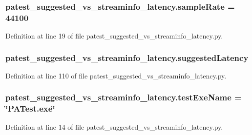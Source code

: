 \subsubsection[{\texorpdfstring{sample\+Rate}{sampleRate}}]{ patest\+\_\+suggested\+\_\+vs\+\_\+streaminfo\+\_\+latency.\+sample\+Rate = 44100}\hypertarget{namespacepatest__suggested__vs__streaminfo__latency_a14f2ecd6f756d329f6df4096833062d0}{}\label{namespacepatest__suggested__vs__streaminfo__latency_a14f2ecd6f756d329f6df4096833062d0}


Definition at line 19 of file patest\+\_\+suggested\+\_\+vs\+\_\+streaminfo\+\_\+latency.\+py.

\subsubsection[{\texorpdfstring{suggested\+Latency}{suggestedLatency}}]{\setlength{\rightskip}{0pt plus 5cm}patest\+\_\+suggested\+\_\+vs\+\_\+streaminfo\+\_\+latency.\+suggested\+Latency}\hypertarget{namespacepatest__suggested__vs__streaminfo__latency_ae87de80b3b414a82eb74a4d0472d0092}{}\label{namespacepatest__suggested__vs__streaminfo__latency_ae87de80b3b414a82eb74a4d0472d0092}


Definition at line 110 of file patest\+\_\+suggested\+\_\+vs\+\_\+streaminfo\+\_\+latency.\+py.

\subsubsection[{\texorpdfstring{test\+Exe\+Name}{testExeName}}]{ patest\+\_\+suggested\+\_\+vs\+\_\+streaminfo\+\_\+latency.\+test\+Exe\+Name = \char`\"{}P\+A\+Test.\+exe\char`\"{}}\hypertarget{namespacepatest__suggested__vs__streaminfo__latency_a06a2ea4a2e1d432bfb9f16ff153f2370}{}\label{namespacepatest__suggested__vs__streaminfo__latency_a06a2ea4a2e1d432bfb9f16ff153f2370}


Definition at line 14 of file patest\+\_\+suggested\+\_\+vs\+\_\+streaminfo\+\_\+latency.\+py.

